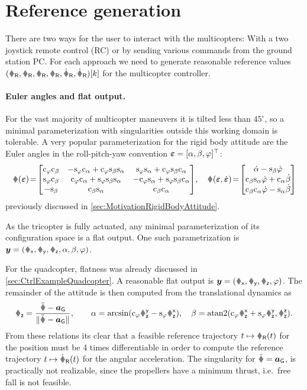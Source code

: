 \section{Reference generation}
There are two ways for the user to interact with the multicopters: With a two joystick remote control (RC) or by sending various commands from the ground station PC.
For each approach we need to generate reasonable reference values $(\rR, \RR, \vR, \wR, \vRd, \wRd)[k]$ for the multicopter controller.

\paragraph{Euler angles and flat output.}
For the vast majority of multicopter maneuvers it is tilted less than $45^\circ$, so a minimal parameterization with singularities outside this working domain is tolerable.
A very popular parameterization for the rigid body attitude are the Euler angles in the roll-pitch-yaw convention $\boldsymbol{\varepsilon} = [\alpha, \beta, \varphi]^\top$:
\begin{align}\label{eq:RealizationEulerAngles}
 \R(\tuple{\varepsilon}) \!=\!
 \begin{bmatrix}
  \cyaw \cpit & -\syaw \crol+\cyaw \spit \srol & \syaw \srol+\cyaw \spit \crol \\
  \syaw \cpit & \cyaw \crol+\syaw \spit \srol & -\cyaw \srol+\syaw \spit \crol \\
  -\spit & \cpit \srol & \cpit \crol  
 \end{bmatrix}\!,
\quad
 \w(\tuple{\varepsilon}, \dot{\tuple{\varepsilon}}) \!=\!
 \begin{bmatrix} 
  \rold - \spit \yawd \\
  \cpit \srol \yawd + \crol \pitd\\
  \cpit \crol \yawd - \srol \pitd
 \end{bmatrix}
\end{align}
previously discussed in \autoref{sec:MotivationRigidBodyAttitude}.

As the tricopter is fully actuated, any minimal parameterization of its configuration space is a flat output.
One such parametrization is $\tuple{y} = (\rx, \ry, \rz, \rol, \pit, \yaw)$.

For the quadcopter, flatness was already discussed in \autoref{sec:CtrlExampleQuadcopter}. 
A reasonable flat output is $\tuple{y} = (\rx, \ry, \rz, \yaw)$.
The remainder of the attitude is then computed from the translational dynamics as
\begin{align}\label{eq:RealizationQuatFlatness}
 \Rz = \frac{\rdd - \gravityAcc}{\norm{\rdd - \gravityAcc}},
\qquad
 \rol = \arcsin(\cyaw \Ryz - \syaw\Rxz),
\quad
 \pit = \atanTwo(\cyaw\Rxz + \syaw \Ryz, \Rzz).
\end{align}
From these relations its clear that a feasible reference trajectory $t\mapsto \rR(t)$ for the position must be 4 times differentiable in order to compute the reference trajectory $t\mapsto\wRd(t)$ for the angular acceleration.
The singularity for $\rdd = \gravityAcc$, is practically not realizable, since the propellers have a minimum thrust, i.e.\ free fall is not feasible.



